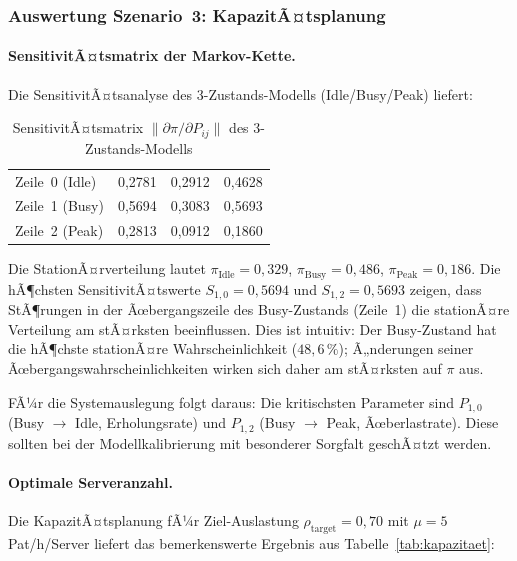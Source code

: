 ﻿\documentclass[a4paper,12pt]{scrreprt}
\theoremstyle{definition}
\begin{document}
\subsubsection{Auswertung Szenario~3: KapazitÃ¤tsplanung}

\paragraph{SensitivitÃ¤tsmatrix der Markov-Kette.}
Die SensitivitÃ¤tsanalyse des 3-Zustands-Modells (Idle/Busy/Peak) liefert:

\begin{table}[H]
	\centering
	\begin{tabular}{@{}lrrr@{}}
		\toprule
		& \boldmath{$\partial\pi / \partial P_{i,0}$} &
		\boldmath{$\partial\pi / \partial P_{i,1}$} &
		\boldmath{$\partial\pi / \partial P_{i,2}$} \\
		\midrule
		Zeile~0 (Idle) & 0{,}2781 & 0{,}2912 & 0{,}4628 \\
		Zeile~1 (Busy) & 0{,}5694 & 0{,}3083 & 0{,}5693 \\
		Zeile~2 (Peak) & 0{,}2813 & 0{,}0912 & 0{,}1860 \\
		\bottomrule
	\end{tabular}
	\caption{SensitivitÃ¤tsmatrix $\|\partial\pi/\partial P_{ij}\|$ des 3-Zustands-Modells}
	\label{tab:sensitivitaet}
\end{table}

Die StationÃ¤rverteilung lautet $\pi_\text{Idle} = 0{,}329$,
$\pi_\text{Busy} = 0{,}486$, $\pi_\text{Peak} = 0{,}186$.
Die hÃ¶chsten SensitivitÃ¤tswerte $S_{1,0} = 0{,}5694$ und
$S_{1,2} = 0{,}5693$ zeigen, dass StÃ¶rungen in der Ãœbergangszeile
des Busy-Zustands (Zeile~1) die stationÃ¤re Verteilung am stÃ¤rksten
beeinflussen. Dies ist intuitiv: Der Busy-Zustand hat die hÃ¶chste
stationÃ¤re Wahrscheinlichkeit ($48{,}6\,\%$); Ã„nderungen seiner
Ãœbergangswahrscheinlichkeiten wirken sich daher am stÃ¤rksten auf $\pi$ aus.

FÃ¼r die Systemauslegung folgt daraus: Die kritischsten Parameter sind
$P_{1,0}$ (Busy $\to$ Idle, Erholungsrate) und $P_{1,2}$
(Busy $\to$ Peak, Ãœberlastrate). Diese sollten bei der Modellkalibrierung
mit besonderer Sorgfalt geschÃ¤tzt werden.

\paragraph{Optimale Serveranzahl.}
Die KapazitÃ¤tsplanung fÃ¼r Ziel-Auslastung $\rho_\text{target} = 0{,}70$
mit $\mu = 5$\,Pat/h/Server liefert das bemerkenswerte Ergebnis aus
Tabelle~\ref{tab:kapazitaet}:
\end{document}
